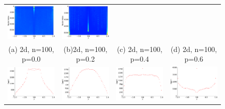 \documentclass[senior,final,11pt]{iscs-thesis}
\begin{document}
\begin{figure}[htbp]
\begin{tabular}{cccc}
    \includegraphics[width=45mm]{figure/grid_graph_deleted_dim(100,100)_pdel04txt_pdos.png} &
    \includegraphics[width=45mm]{figure/grid_graph_deleted_dim(100,100)_pdel06txt_pdos.png} \\
    (a) 2d, n=100, p=0.0 & (b)2d, n=100, p=0.2 &(c) 2d, n=100, p=0.4  & (d) 2d, n=100, p=0.6 \\ [6pt]
    \includegraphics[width=45mm]{figure/grid_graph_deleted_dim(40,40,40)_pdel00txt_dos.png} &
    \includegraphics[width=45mm]{figure/grid_graph_deleted_dim(40,40,40)_pdel02txt_dos.png} &
    \includegraphics[width=45mm]{figure/grid_graph_deleted_dim(40,40,40)_pdel04txt_dos.png} &
    \includegraphics[width=45mm]{figure/grid_graph_deleted_dim(40,40,40)_pdel06txt_dos.png} \\

\end{tabular}
\end{figure}
\end{document}
